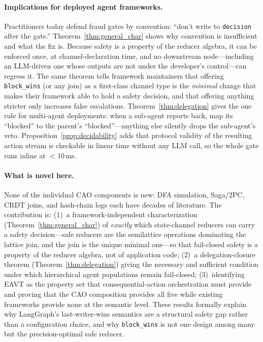 \documentclass{article}
\begin{document}
\paragraph{Implications for deployed agent frameworks.}
Practitioners today defend fraud gates by convention: ``don't write to
\texttt{decision} after the gate.'' Theorem~\ref{thm:general_char} shows why convention
is insufficient and what the fix is. Because safety is a property of the reducer algebra,
it can be enforced once, at channel-declaration time, and no downstream node---including
an LLM-driven one whose outputs are not under the developer's control---can regress it.
The same theorem tells framework maintainers that offering \texttt{block\_wins} (or any
join) as a first-class channel type is the \emph{minimal} change that makes their framework
able to hold a safety decision, and that offering anything stricter only increases
false escalations. Theorem~\ref{thm:delegation} gives the one rule for multi-agent
deployments: when a sub-agent reports back, map its ``blocked'' to the parent's
``blocked''---anything else silently drops the sub-agent's veto. Proposition~\ref{prop:decidability}
adds that protocol validity of the resulting action stream is checkable in linear time
without any LLM call, so the whole gate runs inline at $<$10\,ms.

\paragraph{What is novel here.}
None of the individual CAO components is new: DFA simulation, Saga/2PC, CRDT joins,
and hash-chain logs each have decades of literature. The contribution is:
(1)~a framework-independent characterization (Theorem~\ref{thm:general_char}) of
\emph{exactly} which state-channel reducers can carry a safety decision---safe reducers
are the semilattice operations dominating the lattice join, and the join is the unique
minimal one---so that fail-closed safety is a property of the reducer algebra, not of
application code; (2)~a delegation-closure theorem (Theorem~\ref{thm:delegation}) giving
the necessary and sufficient condition under which hierarchical agent populations remain
fail-closed; (3)~identifying EAVT as the property set that consequential-action
orchestration must provide and proving that the CAO composition provides all five while
existing frameworks provide none at the semantic level. These results formally explain
why LangGraph's last-writer-wins semantics are a structural safety gap rather than a
configuration choice, and why \texttt{block\_wins} is not one design among many but the
precision-optimal safe reducer.
\end{document}
